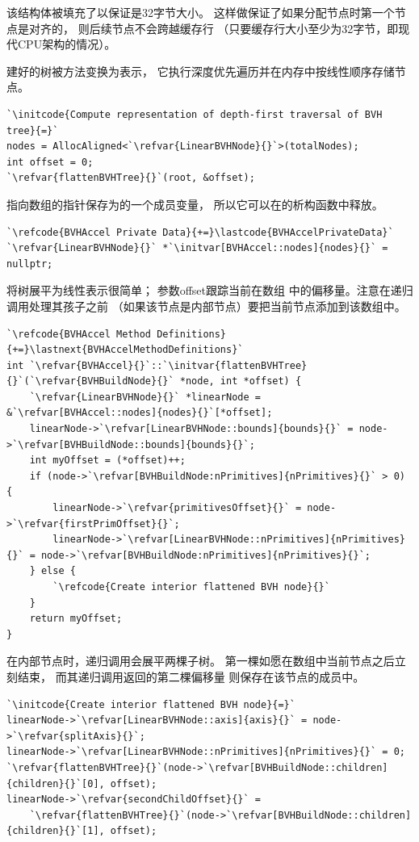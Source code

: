 该结构体被填充了以保证是32字节大小。
这样做保证了如果分配节点时第一个节点是对齐的，
则后续节点不会跨越缓存行
（只要缓存行大小至少为32字节，即现代CPU架构的情况）。

建好的树被方法变换为表示，
它执行深度优先遍历并在内存中按线性顺序存储节点。
\begin{lstlisting}
`\initcode{Compute representation of depth-first traversal of BVH tree}{=}`
nodes = AllocAligned<`\refvar{LinearBVHNode}{}`>(totalNodes);
int offset = 0;
`\refvar{flattenBVHTree}{}`(root, &offset);
\end{lstlisting}

指向数组的指针保存为的一个成员变量，
所以它可以在的析构函数中释放。
\begin{lstlisting}
`\refcode{BVHAccel Private Data}{+=}\lastcode{BVHAccelPrivateData}`
`\refvar{LinearBVHNode}{}` *`\initvar[BVHAccel::nodes]{nodes}{}` = nullptr;
\end{lstlisting}

将树展平为线性表示很简单；
参数{\ttfamily *offset}跟踪当前在数组
中的偏移量。注意在递归调用处理其孩子之前
（如果该节点是内部节点）要把当前节点添加到该数组中。
\begin{lstlisting}
`\refcode{BVHAccel Method Definitions}{+=}\lastnext{BVHAccelMethodDefinitions}`
int `\refvar{BVHAccel}{}`::`\initvar{flattenBVHTree}{}`(`\refvar{BVHBuildNode}{}` *node, int *offset) {
    `\refvar{LinearBVHNode}{}` *linearNode = &`\refvar[BVHAccel::nodes]{nodes}{}`[*offset];
    linearNode->`\refvar[LinearBVHNode::bounds]{bounds}{}` = node->`\refvar[BVHBuildNode::bounds]{bounds}{}`;
    int myOffset = (*offset)++;
    if (node->`\refvar[BVHBuildNode:nPrimitives]{nPrimitives}{}` > 0) {
        linearNode->`\refvar{primitivesOffset}{}` = node->`\refvar{firstPrimOffset}{}`;
        linearNode->`\refvar[LinearBVHNode::nPrimitives]{nPrimitives}{}` = node->`\refvar[BVHBuildNode:nPrimitives]{nPrimitives}{}`;
    } else {
        `\refcode{Create interior flattened BVH node}{}`
    }
    return myOffset;
}
\end{lstlisting}

在内部节点时，递归调用会展平两棵子树。
第一棵如愿在数组中当前节点之后立刻结束，
而其递归调用返回的第二棵偏移量
则保存在该节点的成员中。
\begin{lstlisting}
`\initcode{Create interior flattened BVH node}{=}`
linearNode->`\refvar[LinearBVHNode::axis]{axis}{}` = node->`\refvar{splitAxis}{}`;
linearNode->`\refvar[LinearBVHNode::nPrimitives]{nPrimitives}{}` = 0;
`\refvar{flattenBVHTree}{}`(node->`\refvar[BVHBuildNode::children]{children}{}`[0], offset);
linearNode->`\refvar{secondChildOffset}{}` =
    `\refvar{flattenBVHTree}{}`(node->`\refvar[BVHBuildNode::children]{children}{}`[1], offset);
\end{lstlisting}

